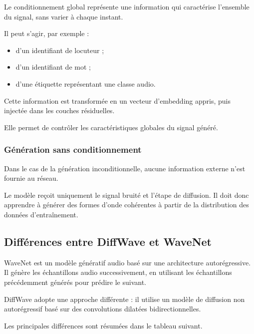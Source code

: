 Le conditionnement global représente une information qui
caractérise l'ensemble du signal, sans varier à chaque instant.

Il peut s'agir, par exemple :
\begin{itemize}
    \item d'un identifiant de locuteur ;
    \item d'un identifiant de mot ;
    \item d'une étiquette représentant une classe audio.
\end{itemize}

Cette information est transformée en un vecteur d'embedding
appris, puis injectée dans les couches résiduelles.

Elle permet de contrôler les caractéristiques globales du
signal généré.

\subsubsection{Génération sans conditionnement}

Dans le cas de la génération inconditionnelle, aucune information
externe n'est fournie au réseau.

Le modèle reçoit uniquement le signal bruité et l'étape de
diffusion. Il doit donc apprendre à générer des formes d'onde
cohérentes à partir de la distribution des données d'entraînement.

\subsection{Différences entre DiffWave et WaveNet}

WaveNet est un modèle génératif audio basé sur une architecture
autorégressive. Il génère les échantillons audio successivement,
en utilisant les échantillons précédemment générés pour prédire
le suivant.

DiffWave adopte une approche différente : il utilise un modèle
de diffusion non autorégressif basé sur des convolutions
dilatées bidirectionnelles.

Les principales différences sont résumées dans le tableau
suivant.

